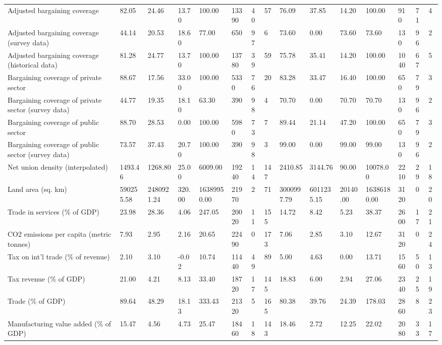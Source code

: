 \begin{longtable}{lllllllllllllll}
Adjusted bargaining coverage & 82.05 & 24.46 & 13.70 & 100.00 & 13390 & 40 & 57 & 76.09 & 37.85 & 14.20 & 100.00 & 910 & 71 & 4\\
Adjusted bargaining coverage (survey data) & 44.14 & 20.53 & 18.60 & 77.00 & 650 & 97 & 6 & 73.60 & 0.00 & 73.60 & 73.60 & 130 & 96 & 2\\
Adjusted bargaining coverage (historical data) & 81.28 & 24.77 & 13.70 & 100.00 & 13780 & 39 & 59 & 75.78 & 35.41 & 14.20 & 100.00 & 1040 & 67 & 5\\
Bargaining coverage of private sector & 88.67 & 17.56 & 33.00 & 100.00 & 5330 & 76 & 20 & 83.28 & 33.47 & 16.40 & 100.00 & 650 & 79 & 3\\
\addlinespace
Bargaining coverage of private sector (survey data) & 44.77 & 19.35 & 18.10 & 63.30 & 390 & 98 & 4 & 70.70 & 0.00 & 70.70 & 70.70 & 130 & 96 & 2\\
Bargaining coverage of public sector & 88.70 & 28.53 & 0.00 & 100.00 & 5980 & 73 & 7 & 89.44 & 21.14 & 47.20 & 100.00 & 650 & 79 & 3\\
Bargaining coverage of public sector (survey data) & 73.57 & 37.43 & 20.70 & 100.00 & 390 & 98 & 3 & 99.00 & 0.00 & 99.00 & 99.00 & 130 & 96 & 2\\
Net union density (interpolated) & 1493.46 & 1268.80 & 25.00 & 6009.00 & 19240 & 14 & 147 & 2410.85 & 3144.76 & 90.00 & 10078.00 & 2210 & 29 & 18\\
Land area (sq. km) & 590255.58 & 2480921.24 & 320.00 & 16389950.00 & 21970 & 2 & 71 & 3000997.79 & 6011235.15 & 20140.00 & 16386180.00 & 3120 & 0 & 20\\
\addlinespace
Trade in services (\% of GDP) & 23.98 & 28.36 & 4.06 & 247.05 & 20020 & 11 & 155 & 14.72 & 8.42 & 5.23 & 38.37 & 2600 & 17 & 21\\
CO2 emissions per capita (metric tonnes) & 7.93 & 2.95 & 2.16 & 20.65 & 22490 & 0 & 173 & 7.06 & 2.85 & 3.10 & 12.67 & 3120 & 0 & 24\\
Tax on int'l trade (\% of revenue) & 2.10 & 3.10 & -0.02 & 10.74 & 11440 & 49 & 89 & 5.00 & 4.63 & 0.00 & 13.71 & 1560 & 50 & 13\\
Tax revenue (\% of GDP) & 21.00 & 4.21 & 8.13 & 33.40 & 18720 & 17 & 145 & 18.83 & 6.00 & 2.94 & 27.06 & 2340 & 25 & 19\\
Trade (\% of GDP) & 89.64 & 48.29 & 18.13 & 333.43 & 21320 & 5 & 165 & 80.38 & 39.76 & 24.39 & 178.03 & 2860 & 8 & 23\\
\addlinespace
Manufacturing value added (\% of GDP) & 15.47 & 4.56 & 4.73 & 25.47 & 18460 & 18 & 143 & 18.46 & 2.72 & 12.25 & 22.02 & 2080 & 33 & 17\\

\end{longtable}
